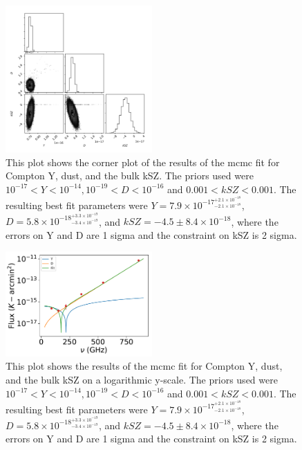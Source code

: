 \documentclass{princeton_astro_thesis}
\begin{document}
\begin{figure}[h]
\centering
\includegraphics[width=0.5\textwidth]{../BulkkSZplot.pdf}
\caption{This plot shows the corner plot of the results of the mcmc fit for Compton Y, dust, and the bulk kSZ. The priors used were $ 10^{-17} < Y < 10^{-14}, 10^{-19}< D < 10^{-16}$ and $0.001 < kSZ <0.001.$ The resulting best fit parameters were $Y=7.9\times10^{-17^{+2.1\times10^{-18}}_{-2.1\times10^{-18}}}$, $D=5.8\times10^{-18^{+3.3\times10^{-19}}_{-3.4\times10^{-19}}}$, and $kSZ=-4.5\pm8.4\times10^{-18}$, where the errors on Y and D are 1 sigma and the constraint on kSZ is 2 sigma.}
\end{figure}

\begin{figure}[h]
\centering
\includegraphics[width=0.5\textwidth]{../redmapper_apfluxes_kSZfitlog.pdf}
\caption{This plot shows  the results of the mcmc fit for Compton Y, dust, and the bulk kSZ on a logarithmic y-scale. The priors used were $ 10^{-17} < Y < 10^{-14}, 10^{-19}< D < 10^{-16}$ and $0.001 < kSZ <0.001.$ The resulting best fit parameters were $Y=7.9\times10^{-17^{+2.1\times10^{-18}}_{-2.1\times10^{-18}}}$, $D=5.8\times10^{-18^{+3.3\times10^{-19}}_{-3.4\times10^{-19}}}$, and $kSZ=-4.5\pm8.4\times10^{-18}$, where the errors on Y and D are 1 sigma and the constraint on kSZ is 2 sigma.} %
\end{figure}
\end{document}
